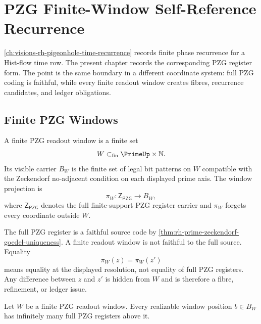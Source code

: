 \chapter{PZG Finite-Window Self-Reference Recurrence}
\label{ch:visions-rh-pzg-finite-window-self-reference-recurrence}

\autoref{ch:visions-rh-pigeonhole-time-recurrence} records finite phase
recurrence for a Hist-flow time row.  The present chapter records the
corresponding PZG register form.  The point is the same boundary in a
different coordinate system: full PZG coding is faithful, while every finite
readout window creates fibres, recurrence candidates, and ledger obligations.

\section{Finite PZG Windows}
\label{sec:rh-pzg-finite-window-self-reference-windows}

\begin{definition}
\label{def:rh-pzg-finite-readout-window}
A finite PZG readout window is a finite set
$$
W\subset_{\mathrm{fin}}\PrimeUp\times\mathbb N.
$$
Its visible carrier $B_W$ is the finite set of legal bit patterns on $W$
compatible with the Zeckendorf no-adjacent condition on each displayed prime
axis.  The window projection is
$$
\pi_W:\mathsf Z_{\mathsf{PZG}}\to B_W,
$$
where $\mathsf Z_{\mathsf{PZG}}$ denotes the full finite-support PZG register
carrier and $\pi_W$ forgets every coordinate outside $W$.
\end{definition}

\begin{principle}
\label{prin:rh-pzg-global-faithfulness-finite-fibres}
The full PZG register is a faithful source code by
\autoref{thm:rh-prime-zeckendorf-goedel-uniqueness}.  A finite readout
window is not faithful to the full source.  Equality
$$
\pi_W(z)=\pi_W(z')
$$
means equality at the displayed resolution, not equality of full PZG
registers.  Any difference between $z$ and $z'$ is hidden from $W$ and is
therefore a fibre, refinement, or ledger issue.
\end{principle}

\begin{theorem}
\label{thm:rh-pzg-finite-window-infinite-fibres}
Let $W$ be a finite PZG readout window.  Every realizable window position
$b\in B_W$ has infinitely many full PZG registers above it.
\end{theorem}

